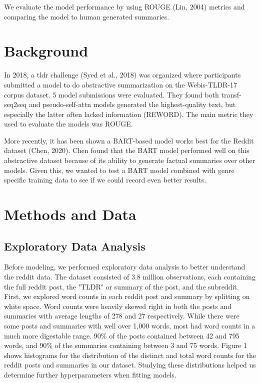\documentclass[11pt,a4paper, twocolumn]{article}
\begin{document}
We evaluate the model performance by using ROUGE (Lin, 2004) metrics and comparing the model to human generated summaries.



\section{Background}
\label{sec:length}

In 2018, a tldr challenge (Syed et al., 2018) was organized where participants submitted a model to do abstractive summarization on the Webis-TLDR-17 corpus dataset. 5 model submissions were evaluated. They found both transf-seq2seq and pseudo-self-attn models generated the highest-quality text, but especially the latter often lacked information (REWORD). The main metric they used to evaluate the models was ROUGE. 

More recently, it has been shown a BART-based model works best for the Reddit dataset (Chen, 2020). Chen found that the BART model performed well on this abstractive dataset because of its ability to generate factual summaries over other models. Given this, we wanted to test a BART model combined with genre specific training data to see if we could record even better results.






\section{Methods and Data}

\subsection{Exploratory Data Analysis}

Before modeling, we performed exploratory data analysis to better understand the reddit data. 
The dataset consisted of 3.8 million observations, each containing the full reddit post, the "TLDR" or summary of the post, and the subreddit. 
First, we explored word counts in each reddit post and summary by splitting on white space. 
Word counts were heavily skewed right in both the posts and summaries with average lengths of 278 and 27 respectively. 
While there were some posts and summaries with well over 1,000 words, most had word counts in a much more digestable range. 
90\% of the posts contained between 42 and 795 words, and 90\% of the summaries containing between 3 and 75 words. 
Figure 1 shows histograms for the distribution of the distinct and total word counts for the reddit posts and summaries in our dataset. 
Studying these distributions helped us determine further hyperparameters when fitting models. 
\end{document}
